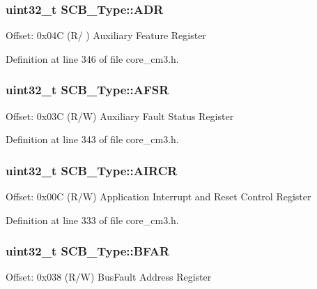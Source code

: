 \subsubsection[{\texorpdfstring{A\+DR}{ADR}}]{ uint32\+\_\+t S\+C\+B\+\_\+\+Type\+::\+A\+DR}\hypertarget{structSCB__Type_aaedf846e435ed05c68784b40d3db2bf2}{}\label{structSCB__Type_aaedf846e435ed05c68784b40d3db2bf2}
Offset\+: 0x04C (R/ ) Auxiliary Feature Register 

Definition at line 346 of file core\+\_\+cm3.\+h.

\subsubsection[{\texorpdfstring{A\+F\+SR}{AFSR}}]{ uint32\+\_\+t S\+C\+B\+\_\+\+Type\+::\+A\+F\+SR}\hypertarget{structSCB__Type_aeb77053c84f49c261ab5b8374e8958ef}{}\label{structSCB__Type_aeb77053c84f49c261ab5b8374e8958ef}
Offset\+: 0x03C (R/W) Auxiliary Fault Status Register 

Definition at line 343 of file core\+\_\+cm3.\+h.

\subsubsection[{\texorpdfstring{A\+I\+R\+CR}{AIRCR}}]{ uint32\+\_\+t S\+C\+B\+\_\+\+Type\+::\+A\+I\+R\+CR}\hypertarget{structSCB__Type_a6ed3c9064013343ea9fd0a73a734f29d}{}\label{structSCB__Type_a6ed3c9064013343ea9fd0a73a734f29d}
Offset\+: 0x00C (R/W) Application Interrupt and Reset Control Register 

Definition at line 333 of file core\+\_\+cm3.\+h.

\subsubsection[{\texorpdfstring{B\+F\+AR}{BFAR}}]{ uint32\+\_\+t S\+C\+B\+\_\+\+Type\+::\+B\+F\+AR}\hypertarget{structSCB__Type_a31f79afe86c949c9862e7d5fce077c3a}{}\label{structSCB__Type_a31f79afe86c949c9862e7d5fce077c3a}
Offset\+: 0x038 (R/W) Bus\+Fault Address Register 

